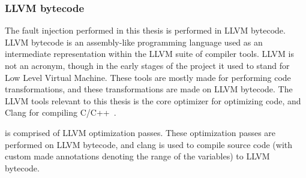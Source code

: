 
\subsubsection{LLVM bytecode}
The fault injection performed in this thesis is performed in LLVM bytecode.
LLVM bytecode is an assembly-like programming language used as an intermediate representation within the LLVM suite of compiler tools. LLVM is not an acronym, though in the early stages of the project it used to stand for Low Level Virtual Machine. These tools are mostly made for performing code transformations, and these transformations are made on LLVM bytecode. The LLVM tools relevant to this thesis is the core optimizer for optimizing code, and Clang for compiling C/C++~\citep{LLVM_homepage}.  %

\taffo{} is comprised of LLVM optimization passes. These optimization passes are performed on LLVM bytecode, and clang is used to compile source code (with custom made annotations denoting the range of the variables) to LLVM bytecode. %

